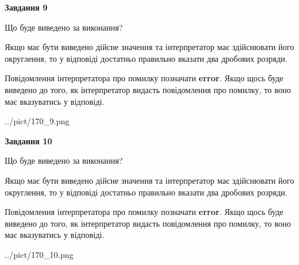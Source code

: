 \documentclass[12pt, ukrainian]{article}
\begin{document}
{\begin {Large}
{\begin {center}\textbf{Завдання 9}\end {center}}\par
Що буде виведено за виконання? \par

Якщо має бути виведено дійсне значення та інтерпретатор має здійснювати його округлення, 
то у відповіді достатньо правильно вказати два дробових розряди.

Повідомлення інтерпретатора про помилку позначати \textbf{error}.
Якщо щось буде виведено до того, як інтерпретатор видасть повідомлення про помилку, 
то воно має вказуватись у відповіді. \par

\begin{center}
	{../pict/170_9.png}
\end{center}
\newpage

{\begin {center}\textbf{Завдання 10}\end {center}}\par
Що буде виведено за виконання? \par

Якщо має бути виведено дійсне значення та інтерпретатор має здійснювати його округлення, 
то у відповіді достатньо правильно вказати два дробових розряди.

Повідомлення інтерпретатора про помилку позначати \textbf{error}.
Якщо щось буде виведено до того, як інтерпретатор видасть повідомлення про помилку, 
то воно має вказуватись у відповіді. \par

\begin{center}
	{../pict/170_10.png}
\end{center}
\newpage

\end {Large}}
\end{document}
